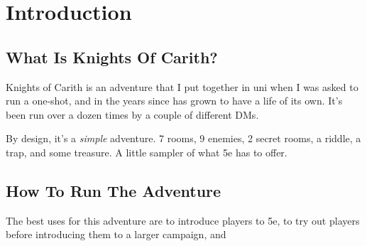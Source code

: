 \twocolumn
\section{Introduction}

\subsection{What Is Knights Of Carith?}
Knights of Carith is an adventure that I put together in uni when I was asked to run a one-shot, and in the years since has grown to have a life of its own. It's been run over a dozen times by a couple of different DMs.

By design, it's a \textit{simple} adventure. 7 rooms, 9 enemies, 2 secret rooms, a riddle, a trap, and some treasure. A little sampler of what 5e has to offer.

\subsection{How To Run The Adventure}
The best uses for this adventure are to introduce players to 5e, to try out players before introducing them to a larger campaign, and 
